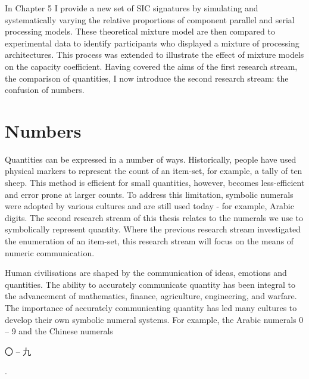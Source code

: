 In Chapter 5 I provide a new set of SIC signatures by simulating and systematically varying the relative proportions of component parallel and serial processing models. These theoretical mixture model are then compared to experimental data to identify participants who displayed a mixture of processing architectures. This process was extended to illustrate the effect of mixture models on the capacity coefficient. Having covered the aims of the first research stream, the comparison of quantities, I now introduce the second research stream: the confusion of numbers.



\section{Numbers}
Quantities can be expressed in a number of ways. Historically, people have used physical markers to represent the count of an item-set, for example, a tally of ten sheep. This method is efficient for small quantities, however, becomes less-efficient and error prone at larger counts. To address this limitation, symbolic numerals were adopted by various cultures and are still used today - for example, Arabic digits. The second research stream of this thesis relates to the numerals we use to symbolically represent quantity. Where the previous research stream investigated the enumeration of an item-set, this research stream will focus on the means of numeric communication.


Human civilisations are shaped by the communication of ideas, emotions and quantities. The ability to accurately communicate quantity has been integral to the advancement of mathematics, finance, agriculture, engineering, and warfare. The importance of accurately communicating quantity has led many cultures to develop their own symbolic numeral systems. For example, the Arabic numerals 0 -- 9 and the Chinese numerals \begin{CJK}{UTF8}{gbsn} 〇 -- 九\end{CJK}. 

